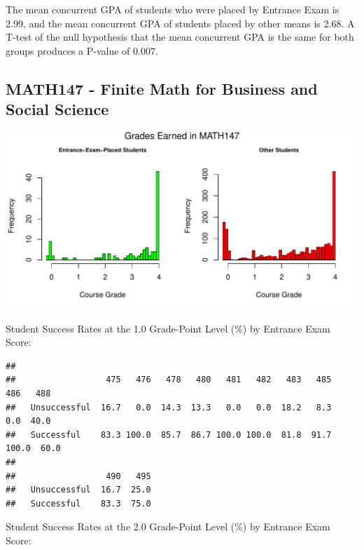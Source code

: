 \documentclass[twoside]{article}\usepackage[]{graphicx}\usepackage[]{color}
\makeatletter
\def\maxwidth{ %
  \ifdim\Gin@nat@width>\linewidth
    \linewidth
  \else
    \Gin@nat@width
  \fi
}
\newenvironment{kframe}{%
 \def\at@end@of@kframe{}%
 \ifinner\ifhmode%
  \def\at@end@of@kframe{\end{minipage}}%
  \begin{minipage}{\columnwidth}%
 \fi\fi%
 \def\FrameCommand##1{\hskip\@totalleftmargin \hskip-\fboxsep
 \colorbox{shadecolor}{##1}\hskip-\fboxsep
     \hskip-\linewidth \hskip-\@totalleftmargin \hskip\columnwidth}%
 \MakeFramed {\advance\hsize-\width
   \@totalleftmargin\z@ \linewidth\hsize
   \@setminipage}}%
 {\par\unskip\endMakeFramed%
 \at@end@of@kframe}
\newenvironment{knitrout}{}{} %
\makeatother
\begin{document}
The mean concurrent GPA of students who were placed by Entrance Exam is 2.99, and the mean concurrent GPA of students placed by other means is 2.68.  A T-test of the null hypothesis that the mean concurrent GPA is the same for both groups produces a P-value of 0.007.



\newpage
\subsection{MATH147 - Finite Math for Business and Social Science}

\begin{knitrout}
\color{fgcolor}
\includegraphics[width=\maxwidth]{figure/graphs147-1} 

\end{knitrout}


Student Success Rates  at the 1.0 Grade-Point Level (\%) by Entrance Exam Score:

\begin{knitrout}
\color{fgcolor}\begin{kframe}
\begin{verbatim}
##               
##                  475   476   478   480   481   482   483   485   486   488
##   Unsuccessful  16.7   0.0  14.3  13.3   0.0   0.0  18.2   8.3   0.0  40.0
##   Successful    83.3 100.0  85.7  86.7 100.0 100.0  81.8  91.7 100.0  60.0
##               
##                  490   495
##   Unsuccessful  16.7  25.0
##   Successful    83.3  75.0
\end{verbatim}
\end{kframe}
\end{knitrout}


Student Success Rates  at the 2.0 Grade-Point Level (\%) by Entrance Exam Score:
\end{document}
